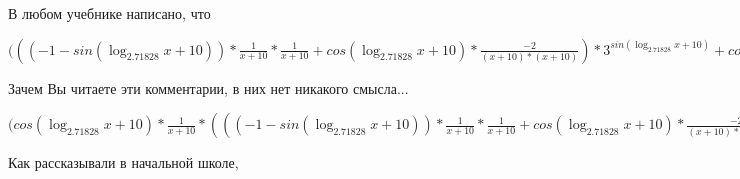 \documentclass[12pt,a4paper,fleqn]{article}
\theoremstyle{definition}
\begin{document}
В любом учебнике написано, что

$((( -1  - sin(\log_{ 2.71828 }{ x  +  10 })) * \frac{ 1 }{ x  +  10 }
 * \frac{ 1 }{ x  +  10 }
 + cos(\log_{ 2.71828 }{ x  +  10 }) * \frac{ -2 }{( x  +  10 ) * ( x  +  10 )}
) * { 3 }^{sin(\log_{ 2.71828 }{ x  +  10 })} + cos(\log_{ 2.71828 }{ x  +  10 }) * \frac{ 1 }{ x  +  10 }
 * cos(\log_{ 2.71828 }{ x  +  10 }) * \frac{ 1 }{ x  +  10 }
 * { 3 }^{sin(\log_{ 2.71828 }{ x  +  10 })} = (( -1  - sin(\log_{ 2.71828 }{ x  +  10 })) * \frac{ 1 }{ x  +  10 }
 * \frac{ 1 }{ x  +  10 }
 + cos(\log_{ 2.71828 }{ x  +  10 }) * \frac{ -2 }{( x  +  10 ) * ( x  +  10 )}
) * { 3 }^{sin(\log_{ 2.71828 }{ x  +  10 })} + cos(\log_{ 2.71828 }{ x  +  10 }) * \frac{ 1 }{ x  +  10 }
 * cos(\log_{ 2.71828 }{ x  +  10 }) * \frac{ 1 }{ x  +  10 }
 * { 3 }^{sin(\log_{ 2.71828 }{ x  +  10 })}$

Зачем Вы читаете эти комментарии, в них нет никакого смысла...

$(cos(\log_{ 2.71828 }{ x  +  10 }) * \frac{ 1 }{ x  +  10 }
 * ((( -1  - sin(\log_{ 2.71828 }{ x  +  10 })) * \frac{ 1 }{ x  +  10 }
 * \frac{ 1 }{ x  +  10 }
 + cos(\log_{ 2.71828 }{ x  +  10 }) * \frac{ -2 }{( x  +  10 ) * ( x  +  10 )}
) * { 3 }^{sin(\log_{ 2.71828 }{ x  +  10 })} + cos(\log_{ 2.71828 }{ x  +  10 }) * \frac{ 1 }{ x  +  10 }
 * cos(\log_{ 2.71828 }{ x  +  10 }) * \frac{ 1 }{ x  +  10 }
 * { 3 }^{sin(\log_{ 2.71828 }{ x  +  10 })}) = cos(\log_{ 2.71828 }{ x  +  10 }) * \frac{ 1 }{ x  +  10 }
 * ((( -1  - sin(\log_{ 2.71828 }{ x  +  10 })) * \frac{ 1 }{ x  +  10 }
 * \frac{ 1 }{ x  +  10 }
 + cos(\log_{ 2.71828 }{ x  +  10 }) * \frac{ -2 }{( x  +  10 ) * ( x  +  10 )}
) * { 3 }^{sin(\log_{ 2.71828 }{ x  +  10 })} + cos(\log_{ 2.71828 }{ x  +  10 }) * \frac{ 1 }{ x  +  10 }
 * cos(\log_{ 2.71828 }{ x  +  10 }) * \frac{ 1 }{ x  +  10 }
 * { 3 }^{sin(\log_{ 2.71828 }{ x  +  10 })})$

Как рассказывали в начальной школе,
\end{document}
